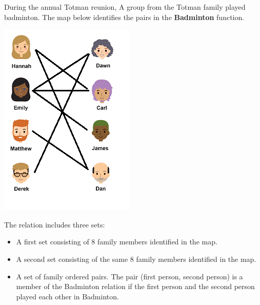 \documentclass{ximera}
\begin{document}
\begin{definition}
  During the annual Totman reunion, A group from the Totman family played badminton. The map below identifies the pairs in the \textbf{Badminton} function.
  
  

    \includegraphics[width=245px,height=352px]{pics/badminton.png}

  
 

  The  relation includes three sets:
    \begin{itemize}
    \item A first set consisting of 8 family members identified in the map.
    \item A second set consisting of the same 8 family members identified in the map.
    \item A set of family ordered pairs. The pair (first person, second person) is a member of the Badminton relation if the first person and the second person played each other in Badminton.
    \end{itemize}

  
\end{definition}
\end{document}
